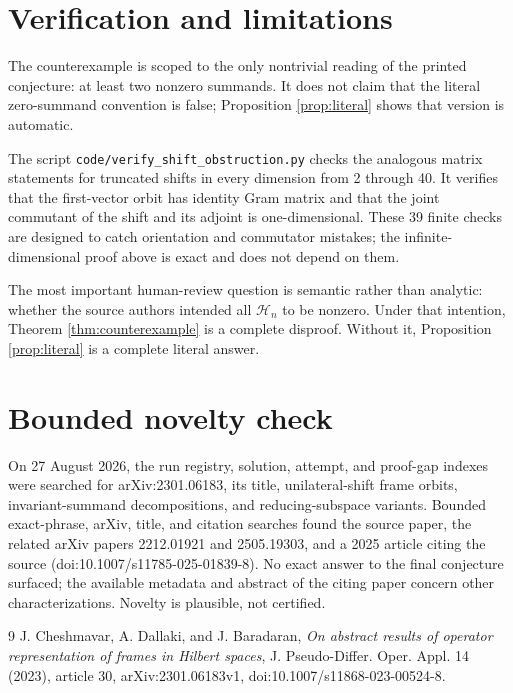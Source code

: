 \documentclass[11pt]{article}
\newcommand{\Hh}{\mathcal H}
\begin{document}
\section{Verification and limitations}

The counterexample is scoped to the only nontrivial reading of the printed
conjecture: at least two nonzero summands.  It does not claim that the literal
zero-summand convention is false; Proposition \ref{prop:literal} shows that
version is automatic.

The script \texttt{code/verify\_shift\_obstruction.py} checks the analogous
matrix statements for truncated shifts in every dimension from 2 through 40.
It verifies that the first-vector orbit has identity Gram matrix and that the
joint commutant of the shift and its adjoint is one-dimensional.  These 39
finite checks are designed to catch orientation and commutator mistakes; the
infinite-dimensional proof above is exact and does not depend on them.

The most important human-review question is semantic rather than analytic:
whether the source authors intended all $\Hh_n$ to be nonzero.  Under that
intention, Theorem \ref{thm:counterexample} is a complete disproof.  Without
it, Proposition \ref{prop:literal} is a complete literal answer.

\section{Bounded novelty check}

On 27 August 2026, the run registry, solution, attempt, and proof-gap indexes
were searched for arXiv:2301.06183, its title, unilateral-shift frame orbits,
invariant-summand decompositions, and reducing-subspace variants.  Bounded
exact-phrase, arXiv, title, and citation searches found the source paper, the
related arXiv papers 2212.01921 and 2505.19303, and a 2025 article citing the
source (doi:10.1007/s11785-025-01839-8).  No exact answer to the final
conjecture surfaced; the available metadata and abstract of the citing paper
concern other characterizations.  Novelty is plausible, not certified.

\begin{thebibliography}{9}
J. Cheshmavar, A. Dallaki, and J. Baradaran,
\emph{On abstract results of operator representation of frames in Hilbert spaces},
J. Pseudo-Differ. Oper. Appl. 14 (2023), article 30,
arXiv:2301.06183v1, doi:10.1007/s11868-023-00524-8.
\end{thebibliography}
\end{document}
